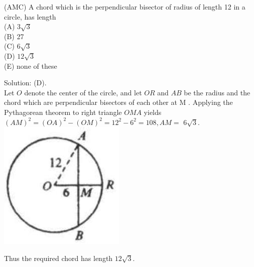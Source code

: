 \documentclass{article}
\begin{document}
(AMC) A chord which is the perpendicular bisector of radius of length 12 in a circle, has length\\
(A) \(3 \sqrt{3}\)\\
(B) 27\\
(C) \(6 \sqrt{3}\)\\
(D) \(12 \sqrt{3}\)\\
(E) none of these

Solution: (D).\\
Let \(O\) denote the center of the circle, and let \(O R\) and \(A B\) be the radius and the chord which are perpendicular bisectors of each other at M . Applying the Pythagorean theorem to right triangle \(O M A\) yields \((A M)^{2}=(O A)^{2}-(O M)^{2}=12^{2}-6^{2}=108, A M=\) \(6 \sqrt{3}\).\\
\centering
\includegraphics[width=\textwidth]{images/150(1).jpg}

Thus the required chord has length \(12 \sqrt{3}\).\\
\end{document}
